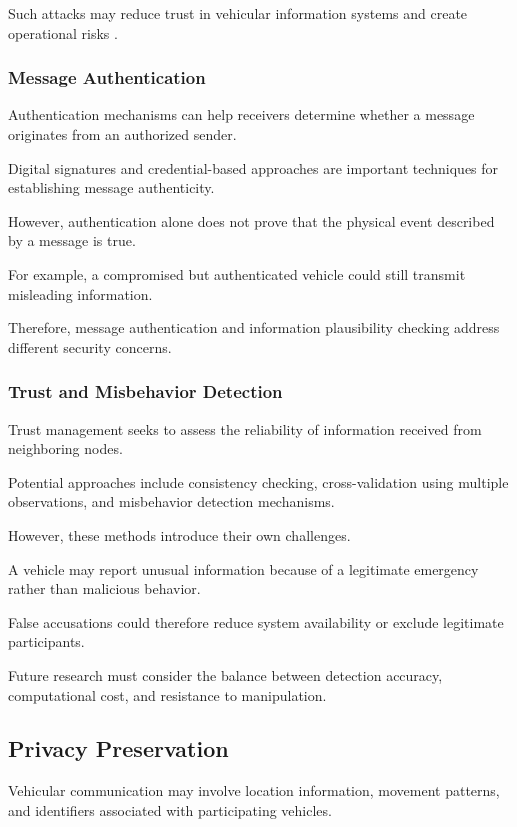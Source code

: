 Such attacks may reduce trust in
vehicular information systems and
create operational risks
\cite{Zeadally2012,Karagiannis2011}.

\subsubsection{Message Authentication}

Authentication mechanisms can help
receivers determine whether a message
originates from an authorized sender.

Digital signatures and credential-based
approaches are important techniques
for establishing message authenticity.

However, authentication alone does
not prove that the physical event
described by a message is true.

For example, a compromised but
authenticated vehicle could still
transmit misleading information.

Therefore, message authentication
and information plausibility checking
address different security concerns.

\subsubsection{Trust and Misbehavior Detection}

Trust management seeks to assess
the reliability of information
received from neighboring nodes.

Potential approaches include
consistency checking, cross-validation
using multiple observations, and
misbehavior detection mechanisms.

However, these methods introduce
their own challenges.

A vehicle may report unusual
information because of a legitimate
emergency rather than malicious behavior.

False accusations could therefore
reduce system availability or
exclude legitimate participants.

Future research must consider
the balance between detection
accuracy, computational cost,
and resistance to manipulation.

\subsection{Privacy Preservation}

Vehicular communication may involve
location information, movement patterns,
and identifiers associated with
participating vehicles.

